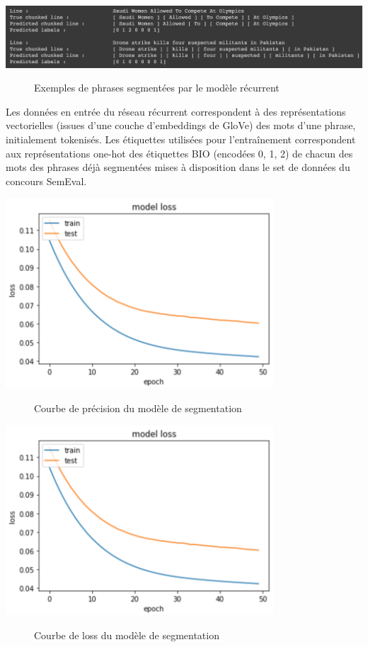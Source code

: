 \documentclass[a4paper, twoside, 11pt]{article}
\begin{document}
  \begin{center}
 \includegraphics[width=14cm,angle=0]{chunks.png}
\begin{figure}[!h]
\caption{Exemples de phrases segmentées par le modèle récurrent}
\end{figure}
 \end{center}

Les données en entrée du réseau récurrent correspondent à des représentations vectorielles (issues d’une couche d’embeddings de GloVe) des mots d’une phrase, initialement tokenisés. Les étiquettes utilisées pour l'entraînement correspondent aux représentations \og one-hot  \fg{} des étiquettes BIO (encodées 0, 1, 2) de chacun des mots des phrases déjà segmentées mises à disposition dans le set de données du concours SemEval.

   \begin{center}
 \includegraphics[width=10cm,angle=0]{loss.png}
\begin{figure}[!h]
\caption{Courbe de précision du modèle de segmentation}
\end{figure}
 \end{center}

 \begin{center}
 \includegraphics[width=10cm,angle=0]{loss.png}
\begin{figure}[!h]
\caption{Courbe de loss du modèle de segmentation}
\end{figure}
 \end{center}
\end{document}
